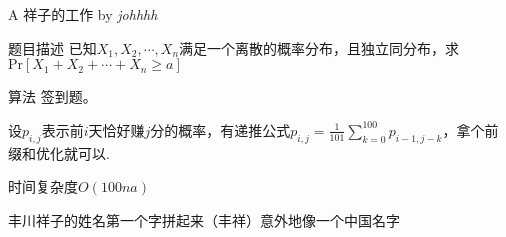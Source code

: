 \begin{frame}{A 祥子的工作 by \itshape {johhhh}}
\begin{block}{题目描述}
已知$X_1,X_2,\cdots,X_n$满足一个离散的概率分布，且独立同分布，求$\text{Pr}[X_1+X_2+\cdots+X_n \ge a]$
\end{block}
\begin{block}{算法}
签到题。

设$p_{i,j}$表示前$i$天恰好赚$j$分的概率，有递推公式$p_{i,j}=\frac{1}{101} \sum_{k=0}^{100} p_{i-1,j-k}$，拿个前缀和优化就可以.

时间复杂度$O\left(100 n a \right)$
\end{block}

丰川祥子的姓名第一个字拼起来（丰祥）意外地像一个中国名字

\end{frame}